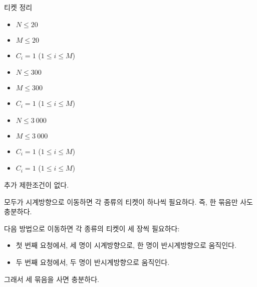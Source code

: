 \begin{problem}{티켓 정리}
	
	\begin{itemize}
		\item $N \le 20$
		\item $M \le 20$
		\item $C_i = 1$ ($1 \le i \le M$)
	\end{itemize}


	\begin{itemize}
		\item $N \le 300$
		\item $M \le 300$
		\item $C_i = 1$ ($1 \le i \le M$)
	\end{itemize}

	\begin{itemize}
		\item $N \le 3\ 000$
		\item $M \le 3\ 000$
		\item $C_i = 1$ ($1 \le i \le M$)
	\end{itemize}

	\begin{itemize}
		\item $C_i = 1$ ($1 \le i \le M$)
	\end{itemize}
	
	
	
	추가 제한조건이 없다.
	
	\Examples
		
	\begin{example}
	\end{example}
	
	모두가 시계방향으로 이동하면 각 종류의 티켓이 하나씩 필요하다. 즉, 한 묶음만 사도 충분하다.	
	
	\begin{example}
	\exmp{
		3 2
		1 2 4
		1 2 2
	}{%
		3
	}%
	\end{example}

	다음 방법으로 이동하면 각 종류의 티켓이 세 장씩 필요하다:
	
	\begin{itemize}
		\item 첫 번째 요청에서, 세 명이 시계방향으로, 한 명이 반시계방향으로 움직인다.
		\item 두 번째 요청에서, 두 명이 반시계방향으로 움직인다.
	\end{itemize}

	그래서 세 묶음을 사면 충분하다.
	

\end{problem}
